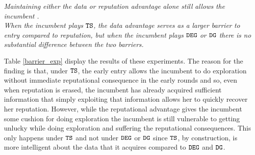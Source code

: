 \documentclass[../competing_bandits.tex]{subfiles}
\begin{document}
\begin{finding}
\textit{Maintaining either the data or reputation advantage alone still allows the incumbent .\\ \indent When the incumbent plays $\mathtt{TS}$, the data advantage serves as a larger barrier to entry compared to reputation, but when the incumbent plays $\mathtt{DEG}$ or $\mathtt{DG}$ there is no substantial difference between the two barriers.}
\end{finding}

Table \ref{barrier_exp} display the results of these experiments. The reason for the finding is that, under $\mathtt{TS}$, the early entry allows the incumbent to do exploration without immediate reputational consequence in the early rounds and so, even when reputation is erased, the incumbent has already acquired sufficient information that simply exploiting that information allows her to quickly recover her reputation. However, while the reputational advantage gives the incumbent some cushion for doing exploration the incumbent is still vulnerable to getting unlucky while doing exploration and suffering the reputational consequences. This only happens under $\mathtt{TS}$ and not under $\mathtt{DEG}$ or $\mathtt{DG}$ since $\mathtt{TS}$, by construction, is more intelligent about the data that it acquires compared to $\mathtt{DEG}$ and $\mathtt{DG}$.

\end{document}
